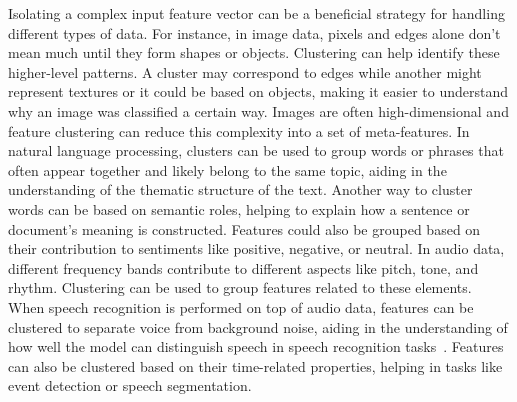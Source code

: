 Isolating a complex input feature vector can be a beneficial strategy for handling different types of data. For instance, in image data, pixels and edges alone don't mean much until they form shapes or objects. Clustering can help identify these higher-level patterns. A cluster may correspond to edges while another might represent textures or it could be based on objects, making it easier to understand why an image was classified a certain way. Images are often high-dimensional  and feature clustering can reduce this complexity into a set of meta-features. In natural language processing, clusters can be used to group words or phrases that often appear together and likely belong to the same topic, aiding in the understanding of the thematic structure of the text. Another way to cluster words can be based on semantic roles, helping to explain how a sentence or document's meaning is constructed. Features could also be grouped based on their contribution to sentiments like positive, negative, or neutral. In audio data, different frequency bands contribute to different aspects like pitch, tone, and rhythm. Clustering can be used to group features related to these elements. When speech recognition is performed on top of audio data, features can be clustered to separate voice from background noise, aiding in the understanding of how well the model can distinguish speech in speech recognition tasks~\cite{malik2021automatic}. Features can also be clustered based on their time-related properties, helping in tasks like event detection or speech segmentation.

